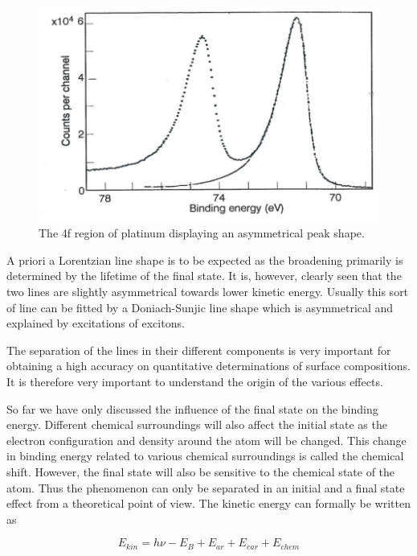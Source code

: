\begin{figure}[h!]
	\begin{center}
	\includegraphics[scale=3.5]{figures/04_17.png}
	\caption{The 4f region of platinum displaying an asymmetrical peak shape.}
	\label{fig:pt4f}
	\end{center}
\end{figure}

A priori a Lorentzian line shape is to be expected as the broadening primarily is determined by the lifetime of the final state. It is, however, clearly seen that the two lines are slightly asymmetrical towards lower kinetic energy. Usually this sort of line can be fitted by a Doniach-Sunjic line shape which is asymmetrical \cite{doniach} and explained by excitations of excitons.

The separation of the lines in their different components is very important for obtaining a high accuracy on quantitative determinations of surface compositions. It is therefore very important to understand the origin of the various effects.

So far  we have only discussed the influence of the final state on the binding energy. Different chemical surroundings will also affect the initial state as the electron configuration and density around the atom will be changed. This change in binding energy related to various chemical surroundings is called the chemical shift. However, the final state will also be sensitive to the chemical state of the atom. Thus the phenomenon can only be separated in an initial and a final state effect from a theoretical point of view. The kinetic energy can formally be written as

\begin{equation}
E_{kin}=h\nu-E_{B}+E_{ar}+E_{ear}+E_{chem}
\end{equation}

